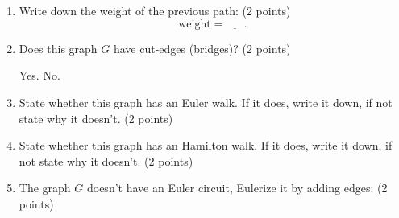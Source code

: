 \documentclass[12pt]{exam}
\begin{document}
\begin{enumerate}
\begin{enumerate}
    \vfill
    \item Write down the weight of the previous path: (2 points)
    \vspace{0.5em}
    $$\text{weight}=\underline{\phantom{ans}}.$$
    \vfill
    \item Does this graph $G$ have cut-edges (bridges)? (2 points)
    \begin{checkboxes}
        \choice Yes.
        \choice No.
    \end{checkboxes}
    \vfill
    \item State whether this graph has an Euler walk. If it does, write it down, if not state why it doesn't. (2 points)
    \vspace{8em}
    \vfill
    \item State whether this graph has an Hamilton walk. If it does, write it down, if not state why it doesn't. (2 points)
    \vspace{8em}
    \vfill
    \newpage
    \item The graph $G$ doesn't have an Euler circuit, Eulerize it by adding edges: (2 points)
    \begin{figure}[h]
        \centering
    
        \begin{tikzpicture}[x=0.75pt,y=0.75pt,yscale=-1,xscale=1]
        

\end{tikzpicture}
\end{figure}
\end{enumerate}
\end{enumerate}
\end{document}
